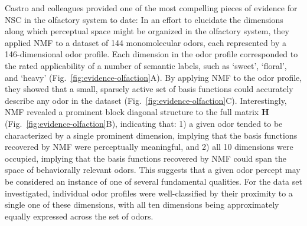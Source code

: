 Castro and colleagues \cite{Castro2013} provided 
one of the most compelling pieces of evidence for \ac{NSC}
in the olfactory system to date:
In an effort to elucidate the dimensions along which perceptual space might be
organized in the olfactory system,
they applied \ac{NMF} to a dataset of 144 monomolecular odors,
each represented by a 146-dimensional odor profile.
Each dimension in the odor profile corresponded to the rated applicability of
a number of semantic labels, such as `sweet', `floral', and `heavy'
(Fig.~\ref{fig:evidence-olfaction}A).
By applying \ac{NMF} to the odor profile, they showed that a small, sparsely active set of basis functions could accurately describe any odor in the dataset
(Fig.~\ref{fig:evidence-olfaction}C).
Interestingly, \ac{NMF} revealed a prominent block
diagonal structure to the full matrix \textbf{H}
(Fig.~\ref{fig:evidence-olfaction}B), indicating that:
1) a given odor tended to be characterized by a single prominent dimension,
implying that the basis functions recovered by \ac{NMF} were perceptually meaningful,
and 2) all 10 dimensions were occupied,
implying that the basis functions recovered by \ac{NMF} could span the space of
behaviorally relevant odors.
This suggests that a given odor percept may be considered an 
instance of one of several fundamental qualities.
For the data set investigated, individual odor profiles were well-classified 
by their proximity to a single one of these dimensions, 
with all ten dimensions being approximately equally expressed 
across the set of odors.

